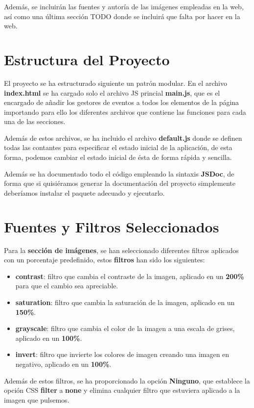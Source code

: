 Además, se incluirán las fuentes y autoría de las imágenes empleadas en la web, así como una última sección TODO donde se incluirá que falta por hacer en la web.


\section{Estructura del Proyecto}
El proyecto se ha estructurado siguiente un patrón modular. En el archivo \textbf{index.html} se ha cargado solo el archivo JS princial \textbf{main.js}, que es el encargado de añadir los gestores de eventos a todos los elementos de la página importando para ello los diferentes archivos que contiene las funciones para cada una de las secciones.

Además de estos archivos, se ha incluido el archivo \textbf{default.js} donde se definen todas las contantes para especificar el estado inicial de la aplicación, de esta forma, podemos cambiar el estado inicial de ésta de forma rápida y sencilla.

Además se ha documentado todo el código empleando la sintaxis \textbf{JSDoc}, de forma que si quisiéramos generar la documentación del proyecto simplemente deberíamos instalar el paquete adecuado y ejecutarlo.

\section{Fuentes y Filtros Seleccionados}
Para la \textbf{sección de imágenes}, se han seleccionado diferentes filtros aplicados con un porcentaje predefinido, estos \textbf{filtros} han sido los siguientes:

\begin{itemize}
    \item \textbf{contrast}: filtro que cambia el contraste de la imagen, aplicado en un \textbf{200\%} para que el cambio sea apreciable.
    \item \textbf{saturation}: filtro que cambia la saturación de la imagen, aplicado en un \textbf{150\%}.
    \item \textbf{grayscale}: filtro que cambia el color de la imagen a una escala de grises, aplicado en un \textbf{100\%}.
    \item \textbf{invert}: filtro que invierte los colores de imagen creando una imagen en negativo, aplicado en un \textbf{100\%}.
\end{itemize}

Además de estos filtros, se ha proporcionado la opción \textbf{Ninguno}, que establece la opción CSS \textbf{filter} a \textbf{none} y
elimina cualquier filtro que estuviera aplicado a la imagen que pulsemos.

